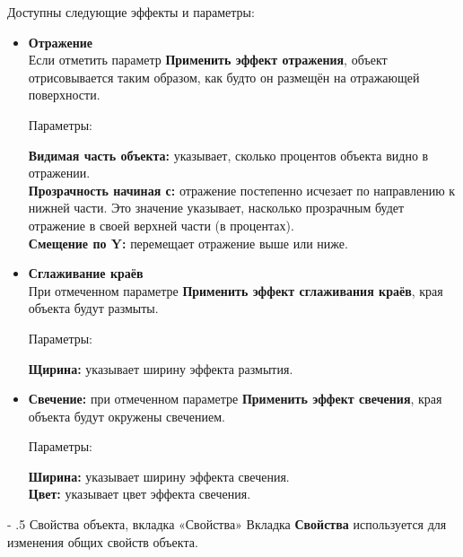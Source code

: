 ﻿\documentclass[a4paper,10pt]{article}
\makeatletter
\renewcommand\paragraph{%
   \@startsection{paragraph}{4}{0mm}%
      {-\baselineskip}%
      {.5\baselineskip}%
      {\normalfont\normalsize\bfseries}}
\makeatother
\begin{document}
 Доступны следующие эффекты и параметры:
 
 \begin{itemize}
  \item  \textbf{Отражение}\\
  Если отметить параметр \textbf{Применить эффект отражения}, объект отрисовывается таким образом, как будто он размещён на отражающей поверхности.
  
  Параметры:
  
  \textbf{Видимая часть объекта:} указывает, сколько процентов объекта видно в отражении.\\
  \textbf{Прозрачность начиная с:} отражение постепенно исчезает по направлению к нижней части. Это значение указывает, насколько прозрачным будет отражение в своей верхней части (в процентах).\\
\textbf{Смещение по Y:} перемещает отражение выше или ниже.
\item \textbf{Сглаживание краёв}\\
При отмеченном параметре \textbf{Применить эффект сглаживания краёв}, края объекта будут размыты.

Параметры:

\textbf{Щирина:} указывает ширину эффекта размытия.
\item \textbf{Свечение:} при отмеченном параметре \textbf{Применить эффект свечения}, края объекта будут окружены свечением.

Параметры: 

\textbf{Ширина:} указывает ширину эффекта свечения.\\
\textbf{Цвет:} указывает цвет эффекта свечения.
 \end{itemize}

\paragraph{Свойства объекта, вкладка «Свойства»} \label{sec:свойстваобъектавклсвойства}
Вкладка \textbf{Свойства} используется для изменения общих свойств объекта.
\end{document}
